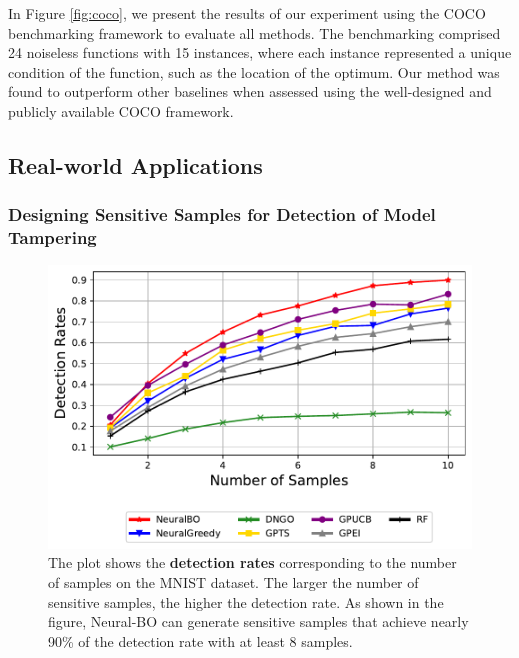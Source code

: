 In Figure \ref{fig:coco}, we present the results of our experiment using the COCO benchmarking framework to evaluate all methods. The benchmarking comprised 24 noiseless functions with 15 instances, where each instance represented a unique condition of the function, such as the location of the optimum. Our method was found to outperform other baselines when assessed using the well-designed and publicly available COCO framework. 


\subsection{Real-world Applications}
\subsubsection{Designing Sensitive Samples for Detection of Model Tampering}
\label{section:neural-bo_sensitive_samples}
\begin{figure}[H]
    \centering
    \includegraphics[width=\textwidth]{Figures/Neural-BO/Neural-BO_sensitive_sample_detection_rate.pdf}
    \caption{The plot shows the \textbf{detection rates} corresponding to the number of samples on the MNIST dataset. The larger the number of sensitive samples, the higher the detection rate. As shown in the figure, Neural-BO can generate sensitive samples that achieve nearly 90\% of the detection rate with at least 8 samples.}
    \label{fig:neural-bo_sensitive_sample}
\end{figure}

